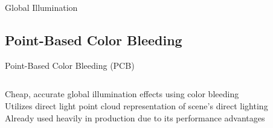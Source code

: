 \documentclass[10pt,handout,compress,professionalfont]{beamer}
\begin{document}
\begin{frame}{Global Illumination}
\end{frame}




\subsection{Point-Based Color Bleeding}
\begin{frame}{Point-Based Color Bleeding (PCB)}


    \begin{columns}
        \begin{column}{0.65\textwidth}
            Cheap, accurate global illumination effects using color bleeding\\
            \vspace{8mm}
            Utilizes direct light point cloud representation of scene's direct lighting\\
            \vspace{8mm}
            Already used heavily in production due to its performance advantages


\end{column}
\end{columns}
\end{frame}
\end{document}

